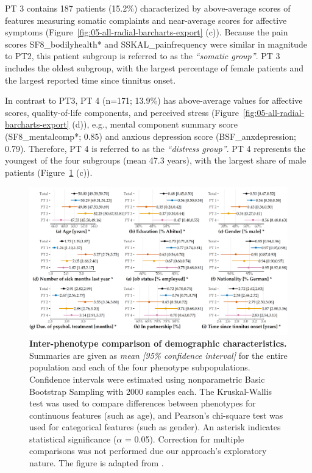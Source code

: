 \documentclass[
  oneside]{book}
\begin{document}
PT 3 contains 187 patients (15.2\%) characterized by above-average scores of features measuring somatic complaints and near-average scores for affective symptoms (Figure~\ref{fig:05-all-radial-barcharts-export} (c)).
Because the pain scores SF8\_bodilyhealth* and SSKAL\_painfrequency were similar in magnitude to PT2, this patient subgroup is referred to as the \emph{``somatic group''}.
PT 3 includes the oldest subgroup, with the largest percentage of female patients and the largest reported time since tinnitus onset.

In contrast to PT3, PT 4 (n=171; 13.9\%) has above-average values for affective scores, quality-of-life components, and perceived stress (Figure~\ref{fig:05-all-radial-barcharts-export} (d)), e.g., mental component summary score (SF8\_mentalcomp*; 0.85) and anxious depression score (BSF\_anxdepression; 0.79).
Therefore, PT 4 is referred to as the \emph{``distress group''}.
PT 4 represents the youngest of the four subgroups (mean 47.3 years), with the largest share of male patients (Figure~\ref{fig:05-inter-group-socio} (c)).



\begin{figure}[htb]

{\centering \includegraphics[width=1\linewidth]{figures/05-inter-group-socio} 

}

\caption{\textbf{Inter-phenotype comparison of demographic characteristics.} Summaries are given as \emph{mean {[}95\% confidence interval{]}} for the entire population and each of the four phenotype subpopulations. Confidence intervals were estimated using nonparametric Basic Bootstrap Sampling \autocite{Davidson:Bootstrap1997} with 2000 samples each. The Kruskal-Wallis test was used to compare differences between phenotypes for continuous features (such as age), and Pearson's chi-square test was used for categorical features (such as gender). An asterisk indicates statistical significance (\(\alpha\) = 0.05). Correction for multiple comparisons was not performed due our approach's exploratory nature. The figure is adapted from \autocite{Niemann:SREP_Pheno2020}.}\label{fig:05-inter-group-socio}
\end{figure}
\end{document}
